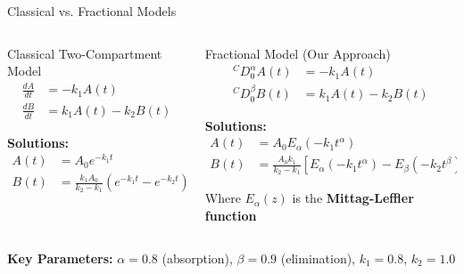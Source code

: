 \documentclass[aspectratio=169]{beamer}
\newcommand{\highlight}[1]{\textcolor{kentech_orange}{\textbf{#1}}}
\begin{document}
\begin{frame}{Classical vs. Fractional Models}
    \begin{columns}
        \begin{column}{0.5\textwidth}
            \begin{block}{Classical Two-Compartment Model}
                \begin{align}
                    \frac{dA}{dt} &= -k_1 A(t) \\
                    \frac{dB}{dt} &= k_1 A(t) - k_2 B(t)
                \end{align}
                
                \textbf{Solutions:}
                \begin{align}
                    A(t) &= A_0 e^{-k_1 t} \\
                    B(t) &= \frac{k_1 A_0}{k_2-k_1}(e^{-k_1 t} - e^{-k_2 t})
                \end{align}
            \end{block}
        \end{column}
        
        \begin{column}{0.5\textwidth}
            \begin{block}{Fractional Model (Our Approach)}
                \begin{align}
                    {}^C D_0^\alpha A(t) &= -k_1 A(t) \\
                    {}^C D_0^\beta B(t) &= k_1 A(t) - k_2 B(t)
                \end{align}
                
                \textbf{Solutions:}
                \begin{align}
                    A(t) &= A_0 E_\alpha(-k_1 t^\alpha) \\
                    B(t) &= \frac{A_0 k_1}{k_2-k_1}[E_\alpha(-k_1 t^\alpha) - E_\beta(-k_2 t^\beta)]
                \end{align}
                
                Where $E_\alpha(z)$ is the \highlight{Mittag-Leffler function}
            \end{block}
        \end{column}
    \end{columns}
    
    \vspace{0.3cm}
    \begin{center}
        \highlight{Key Parameters:} $\alpha = 0.8$ (absorption), $\beta = 0.9$ (elimination), $k_1 = 0.8$, $k_2 = 1.0$
    \end{center}
\end{frame}
\end{document}
